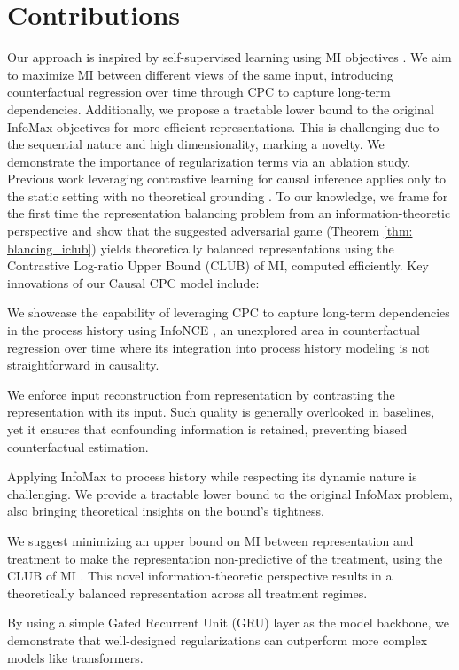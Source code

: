 \documentclass{article}
\theoremstyle{plain}
\theoremstyle{definition}
\theoremstyle{remark}
\begin{document}
\section{Contributions}
Our approach is inspired by self-supervised learning using MI objectives \citep{DeepInfoMax2019}. We aim to maximize MI between different views of the same input, introducing counterfactual regression over time through CPC to capture long-term dependencies. Additionally, we propose a tractable lower bound to the original InfoMax objectives for more efficient representations. This is challenging due to the sequential nature and high dimensionality, marking a novelty. We demonstrate the importance of regularization terms via an ablation study. Previous work leveraging contrastive learning for causal inference applies only to the static setting with no theoretical grounding \citep{infomax_static2022}. To our knowledge, we frame for the first time the representation balancing problem from an information-theoretic perspective and show that the suggested adversarial game (Theorem \ref{thm: blancing_iclub}) yields theoretically balanced representations using the Contrastive Log-ratio Upper Bound (CLUB) of MI, computed efficiently. Key innovations of our Causal CPC model include:
\begin{inparaenum}[(1)]
    \item We showcase the capability of leveraging CPC to capture long-term dependencies in the process history using InfoNCE \citep{gutmann2010nce, gutmann2012nce, oord2018representation}, an unexplored area in counterfactual regression over time where its integration into process history modeling is not straightforward in causality.
    \item We enforce input reconstruction from representation by contrasting the representation with its input. Such quality is generally overlooked in baselines, yet it ensures that confounding information is retained, preventing biased counterfactual estimation.
    \item Applying InfoMax to process history while respecting its dynamic nature is challenging. We provide a tractable lower bound to the original InfoMax problem, also bringing theoretical insights on the bound's tightness.    
    \item We suggest minimizing an upper bound on MI between representation and treatment to make the representation non-predictive of the treatment, using the CLUB of MI \citep{cheng2020club}. This novel information-theoretic perspective results in a theoretically balanced representation across all treatment regimes.    
    \item By using a simple Gated Recurrent Unit (GRU) layer \citep{cho2014GRU} as the model backbone, we demonstrate that well-designed regularizations can outperform more complex models like transformers.
\end{inparaenum}
\end{document}
